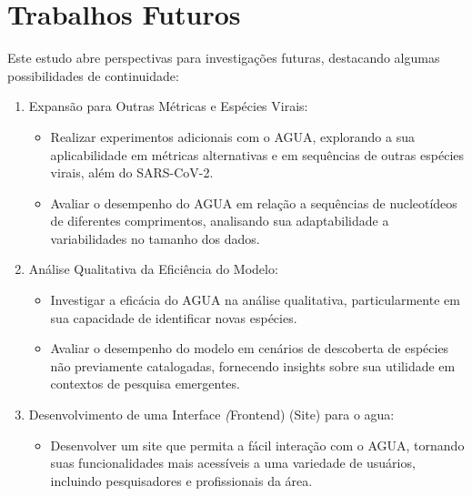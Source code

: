 \chapter{Trabalhos Futuros}

Este estudo abre perspectivas para investigações futuras, destacando algumas possibilidades de continuidade:

\begin{enumerate}
  \item Expansão para Outras Métricas e Espécies Virais:
        \begin{itemize}
          \item Realizar experimentos adicionais com o AGUA, explorando a sua aplicabilidade em métricas alternativas e em sequências de outras espécies virais, além do SARS-CoV-2.
          \item Avaliar o desempenho do AGUA em relação a sequências de nucleotídeos de diferentes comprimentos, analisando sua adaptabilidade a variabilidades no tamanho dos dados.
        \end{itemize}
  \item Análise Qualitativa da Eficiência do Modelo:
        \begin{itemize}
          \item Investigar a eficácia do AGUA na análise qualitativa, particularmente em sua capacidade de identificar novas espécies.
          \item Avaliar o desempenho do modelo em cenários de descoberta de espécies não previamente catalogadas, fornecendo insights sobre sua utilidade em contextos de pesquisa emergentes.
        \end{itemize}
  \item Desenvolvimento de uma Interface \textit(Frontend) (Site) para o \gls{agua}:
        \begin{itemize}
          \item Desenvolver um site que permita a fácil interação com o AGUA, tornando suas funcionalidades mais acessíveis a uma variedade de usuários, incluindo pesquisadores e profissionais da área.
        \end{itemize}
\end{enumerate}

